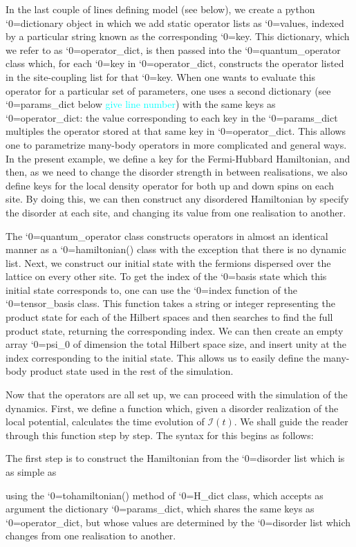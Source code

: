 \documentclass{SciPost}
\newcommand\0{\scalebox{-1}[1]{0}}
\let\svttfamily\ttfamily
\renewcommand\ttfamily{\svttfamily\catcode`0=\active }
\renewcommand\texttt{\bgroup\ttfamily\texttthelp}
\def\texttthelp#1{#1\egroup}
\newcommand*{\cyan}{\textcolor{cyan}}
\newcommand{\MBLcode}{example6.py}
\begin{document}
In the last couple of lines defining model (see below), we create a python \texttt{dictionary} object in which we add static operator lists as \texttt{values}, indexed by a particular string known as the corresponding \texttt{key}. This dictionary, which we refer to as \texttt{operator\_dict}, is then passed into the \texttt{quantum\_operator} class which, for each \texttt{key} in \texttt{operator\_dict}, constructs the operator listed in the site-coupling list for that \texttt{key}. When one wants to evaluate this operator for a particular set of parameters, one uses a second dictionary (see \texttt{params\_dict} below \cyan{give line number}) with the same keys as \texttt{operator\_dict}: the value corresponding to each key in the \texttt{params\_dict} multiples the operator stored at that same key in \texttt{operator\_dict}. This allows one to parametrize many-body operators in more complicated and general ways. In the present example, we define a key for the Fermi-Hubbard Hamiltonian, and then, as we need to change the disorder strength in between realisations, we also define keys for the local density operator for both up and down spins on each site. By doing this, we can then construct any disordered Hamiltonian by specify the disorder at each site, and changing its value from one realisation to another.

 

The \texttt{quantum\_operator} class constructs operators in almost an identical manner as a \texttt{hamiltonian()} class with the exception that there is no dynamic list. Next, we construct our initial state with the fermions dispersed over the lattice on every other site. To get the index of the \texttt{basis} state which this initial state corresponds to, one can use the \texttt{index} function of the \texttt{tensor\_basis} class. This function takes a string or integer representing the product state for each of the Hilbert spaces and then searches to find the full product state, returning the corresponding index. We can then create an empty array \texttt{psi\_0} of dimension the total Hilbert space size, and insert unity at the index corresponding to the initial state. This allows us to easily define the many-body product state used in the rest of the simulation.


Now that the operators are all set up, we can proceed with the simulation of the dynamics. First, we define a function which, given a disorder realization of the local potential, calculates the time evolution of $\mathcal{I}(t)$. We shall guide the reader through this function step by step. The syntax for this begins as follows:

The first step is to construct the Hamiltonian from the \texttt{disorder} list which is as simple as

using the \texttt{tohamiltonian()} method of \texttt{H\_dict} class, which accepts as argument the dictionary \texttt{params\_dict}, which shares the same keys as \texttt{operator\_dict}, but whose values are determined by the \texttt{disorder} list which changes from one realisation to another. 
\end{document}
